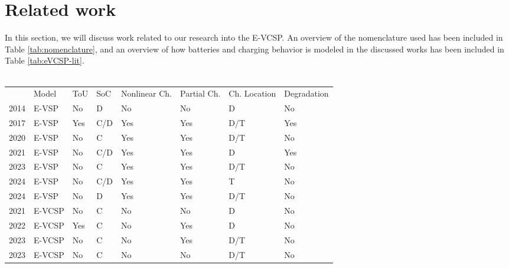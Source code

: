 \documentclass[]{book}
\begin{document}
\section{Related work}
In this section, we will discuss work related to our research into the E-VCSP.
An overview of the nomenclature used has been included in Table \ref{tab:nomenclature}, and an overview of how batteries and charging behavior is modeled in the discussed works has been included in Table \ref{tab:eVCSP-lit}. \\\\
\begin{table}[]
  \centering
  \begin{tabular}{clllllll}
    \toprule
                                     & Model   & ToU & SoC & Nonlinear Ch. & Partial Ch. & Ch. Location & Degradation \\
    \cmidrule(lr){2-8}
    \cite{Li2014} 2014               & E-VSP   & No  & D   & No            & No          & D            & No          \\
    \cite{vanKootenNiekerk2017} 2017 & E-VSP   & Yes & C/D & Yes           & Yes         & D/T          & Yes         \\
    \cite{Olsen2020} 2020            & E-VSP   & No  & C   & Yes           & Yes         & D/T          & No          \\
    \cite{Zhang2021} 2021            & E-VSP   & No  & C/D & Yes           & Yes         & D            & Yes         \\
    \cite{Parmentier2023} 2023       & E-VSP   & No  & C   & Yes           & Yes         & D/T          & No          \\
    \cite{Pulyassary2024} 2024       & E-VSP   & No  & C/D & Yes           & Yes         & T            & No          \\
    \cite{deVos2024} 2024            & E-VSP   & No  & D   & Yes           & Yes         & D/T          & No          \\
    \addlinespace[0.4em]
    \cite{Perumal2021} 2021          & E-VCSP  & No  & C   & No            & No          & D            & No          \\
    \cite{Wang2022} 2022             & E-VCSP  & Yes & C   & No            & Yes         & D            & No          \\
    \cite{Sistig2023} 2023           & E-VCSP  & No  & C   & No            & Yes         & D/T          & No          \\
    \cite{Shen2023} 2023             & E-VCSP  & No  & C   & No            & No          & D/T          & No          \\

\end{tabular}
\end{table}
\end{document}
